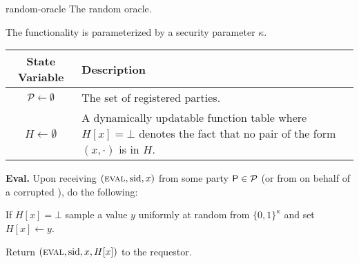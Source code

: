 \begin{cccFunctionality}{\funcRO}
    {random-oracle}
    {The random oracle.}

    The functionality is parameterized by a security parameter $\kappa$.

    \addtocounter{table}{-1}
    \begin{tabularx}{.9\textwidth}{c  X}
        \toprule[.3mm]
        \textbf{State Variable}
         & \textbf{Description}
        \\ \midrule[.3mm]
        $\mathcal{P} \gets \emptyset$
         & The set of registered parties.
        \\ \midrule
        $H \gets \emptyset$
         & A dynamically updatable function table where $H[x] = \bot$ denotes the fact that no pair of the form $(x, \cdot)$ is in $H$.
        \\ \bottomrule[.3mm]
    \end{tabularx}

    \begin{cccItemize}[noitemsep]
        \item \textbf{Eval.} Upon receiving $(\textsc{eval}, \mathrm{sid}, x)$ from some party $\mathsf{P} \in \mathcal{P}$ (or from \adv on behalf of a corrupted \party), do the following:
        \begin{cccEnum}[nosep]
            \item If $H[x] = \bot$ sample a value $y$ uniformly at random from $\{0, 1\}^\kappa$ and set $H[x] \gets y$.
            \item Return $(\textsc{eval}, \mathrm{sid}, x, H[x])$ to the requestor.
        \end{cccEnum}
    \end{cccItemize}
\end{cccFunctionality}

